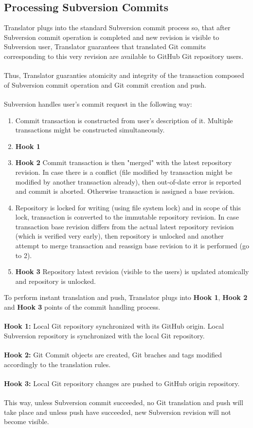\subsection{Processing Subversion Commits}

Translator plugs into the standard Subversion commit process so, that after Subversion commit operation
is completed and new revision is visible to Subversion user, Translator guarantees that translated Git commits
corresponding to this very revision are available to GitHub Git repository users.
\\\\
Thus, Translator guaranties atomicity and integrity of the transaction composed of Subversion commit operation
and Git commit creation and push.
\\\\
Subversion handles user's commit request in the following way:

\begin{enumerate}
\item Commit transaction is constructed from user's description of it. Multiple transactions might be constructed simultaneously.
\item \textbf{Hook 1} %
\item \textbf{Hook 2} Commit transaction is then "merged" with the latest repository revision. In case there is a conflict (file modified by transaction might be modified by another transaction already), then out-of-date error is reported and commit is aborted. Otherwise transaction is assigned a base revision.
\item Repository is locked for writing (using file system lock) and in scope of this lock, transaction is converted to the immutable repository revision. In case transaction base revision differs from the actual latest repository revision (which is verified very early), then repository is unlocked and another attempt to merge transaction and reassign base revision to it is performed (go to 2).
\item \textbf{Hook 3} Repository latest revision (visible to the users) is updated atomically and repository is unlocked.
\end{enumerate}
To perform instant translation and push, Translator plugs into \textbf{Hook 1}, \textbf{Hook 2} and \textbf{Hook 3} points of the commit handling process.
\\\\
\textbf{Hook 1:} Local Git repository synchronized with its GitHub origin. Local Subversion repository is synchronized with the local Git repository.
\\\\
\textbf{Hook 2:} Git Commit objects are created, Git braches and tags modified accordingly to the translation rules.
\\\\
\textbf{Hook 3:} Local Git repository changes are pushed to GitHub origin repository.
\\\\
This way, unless Subversion commit succeeded, no Git translation and push will take place and unless push have succeeded, new Subversion revision will not become visible.
